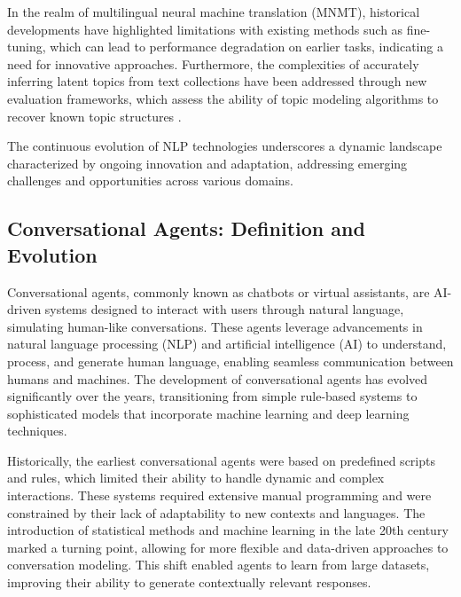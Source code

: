 In the realm of multilingual neural machine translation (MNMT), historical developments have highlighted limitations with existing methods such as fine-tuning, which can lead to performance degradation on earlier tasks, indicating a need for innovative approaches. Furthermore, the complexities of accurately inferring latent topics from text collections have been addressed through new evaluation frameworks, which assess the ability of topic modeling algorithms to recover known topic structures \cite{yamshchikov2020styletransferparaphraselookingsensible}.



The continuous evolution of NLP technologies underscores a dynamic landscape characterized by ongoing innovation and adaptation, addressing emerging challenges and opportunities across various domains.



\subsection{Conversational Agents: Definition and Evolution} \label{subsec:Conversational Agents: Definition and Evolution}

Conversational agents, commonly known as chatbots or virtual assistants, are AI-driven systems designed to interact with users through natural language, simulating human-like conversations. These agents leverage advancements in natural language processing (NLP) and artificial intelligence (AI) to understand, process, and generate human language, enabling seamless communication between humans and machines. The development of conversational agents has evolved significantly over the years, transitioning from simple rule-based systems to sophisticated models that incorporate machine learning and deep learning techniques.



Historically, the earliest conversational agents were based on predefined scripts and rules, which limited their ability to handle dynamic and complex interactions. These systems required extensive manual programming and were constrained by their lack of adaptability to new contexts and languages. The introduction of statistical methods and machine learning in the late 20th century marked a turning point, allowing for more flexible and data-driven approaches to conversation modeling. This shift enabled agents to learn from large datasets, improving their ability to generate contextually relevant responses.



